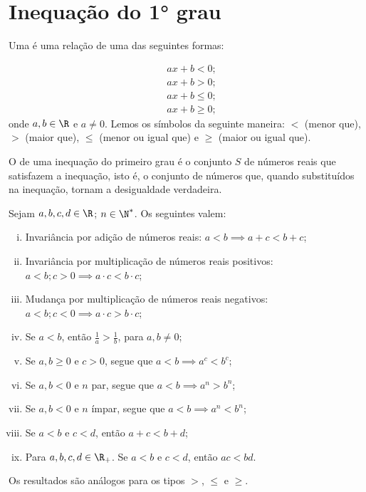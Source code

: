\section{Inequação do 1° grau}

\begin{definition}
Uma  é uma relação de uma das seguintes formas:

\begin{align*}
& ax+b <0;\\
& ax+b >0;\\
& ax+b \le 0;\\
& ax+b \ge 0;
\end{align*}
%
onde $a, b \in \R$ e $ a \neq 0$. Lemos os símbolos da seguinte maneira: $<$ (menor que), $>$ (maior que), $\leq$ (menor ou igual
que) e $\geq$ (maior ou igual que).
\end{definition}

\begin{remark}
O  de uma inequação do primeiro grau é o conjunto $S$ de números reais que satisfazem a inequação, isto é, o conjunto de números que, quando substituídos na inequação, tornam a desigualdade verdadeira.
\end{remark}

\begin{proposition}
Sejam $a, b, c, d \in \R$; $n \in \N^*$. Os seguintes valem:
%
\begin{enumerate}[i.]
  \item Invariância por adição de números reais: $a < b \implies a+c < b+c$;
  \item Invariância por multiplicação de números reais positivos:
  $a < b ; c>0 \implies a \cdot c < b \cdot c$;
  \item Mudança por multiplicação de números reais
  negativos: $a < b ; c<0 \implies a \cdot c > b \cdot c$;
  \item Se $a < b$, então $\frac 1 a > \frac 1 b$, para $a, b \neq
  0$;
  \item Se $a,b \geq 0$ e $c>0$, segue que $a < b \implies a^c < b^c$;
  \item Se $a,b < 0$ e $n$ par, segue que $a < b \implies a^n > b^n$;
  \item Se $a,b < 0$ e $n$ ímpar, segue que $a < b \implies a^n <
  b^n$;
  \item Se $a< b$ e $c< d$, então $a+c < b+d$;
  \item Para $a, b, c, d \in \R_+$. Se $a< b$ e $c< d$, então $ac < bd$.
\end{enumerate}
%
Os resultados são análogos para os tipos $>$, $\leq$ e $\geq$.
\end{proposition}

